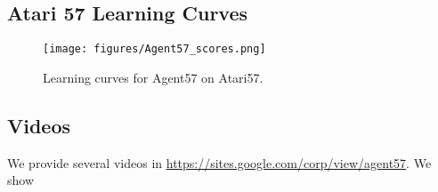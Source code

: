 \documentclass{article}
\begin{document}
\subsection{Atari 57 Learning Curves}
\label{app:scores}
\begin{figure}[!ht]
    \centering
    \texttt{[image: figures/Agent57\_scores.png]}
    \caption{Learning curves for Agent57 on Atari57.} 
    \label{fig:atari57learningcurves}
\end{figure}

\newpage
\subsection{Videos}
\label{app:videos}

We provide several videos in \url{https://sites.google.com/corp/view/agent57}. We show 
\end{document}
